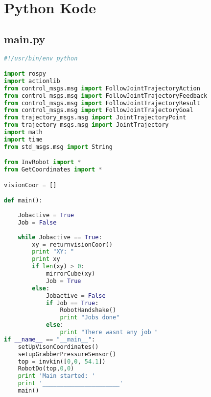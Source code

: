 \chapter{Python Kode}\label{app:PythonKode}
\section{main.py}\label{sec:Main}
\begin{lstlisting}[language=Python]
#!/usr/bin/env python

import rospy
import actionlib
from control_msgs.msg import FollowJointTrajectoryAction
from control_msgs.msg import FollowJointTrajectoryFeedback
from control_msgs.msg import FollowJointTrajectoryResult
from control_msgs.msg import FollowJointTrajectoryGoal
from trajectory_msgs.msg import JointTrajectoryPoint
from trajectory_msgs.msg import JointTrajectory
import math
import time
from std_msgs.msg import String

from InvRobot import *
from GetCoordinates import *

visionCoor = []

def main():
        
    Jobactive = True
    Job = False
    
    while Jobactive == True:
        xy = returnvisionCoor()
        print "XY: "
        print xy
        if len(xy) > 0:
            mirrorCube(xy)
            Job = True
        else:
            Jobactive = False
            if Job == True:
                RobotHandshake()
                print "Jobs done"
            else:
                print "There wasnt any job "                
if __name__ == "__main__":
    setUpVisonCoordinates()
    setupGrabberPressureSensor()
    top = invkin([0,0, 54.1])
    RobotDo(top,0,0)
    print 'Main started: '
    print '______________________'
    main()
\end{lstlisting}

